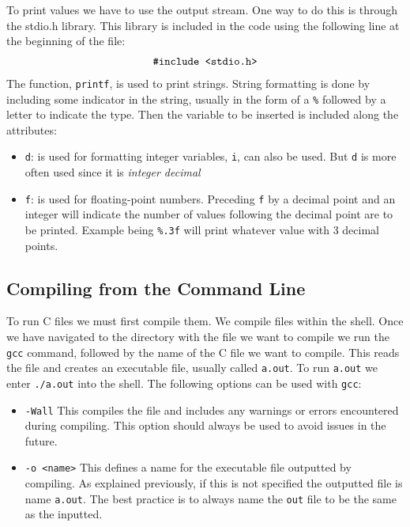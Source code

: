 \documentclass{report}
\begin{document}
    To print values we have to use the output stream. One way to do this is through the stdio.h library. This library is included in the code using the following line at the beginning of the file:
    \begin{align}
      \textnormal{\texttt{\#include <stdio.h>}}
    \end{align}
    The function, \texttt{printf}, is used to print strings. String formatting is done by including some indicator in the string, usually in the form of a \texttt{\%} followed by a letter to indicate the type. Then the variable to be inserted is included along the attributes:
    \begin{itemize}
      \item \texttt{d}: is used for formatting integer variables, \texttt{i}, can also be used. But \texttt{d} is more often used since it is \textit{integer decimal}
      \item \texttt{f}: is used for floating-point numbers. Preceding \texttt{f} by a decimal point and an integer will indicate the number of values following the decimal point are to be printed. Example being \texttt{\%.3f} will print whatever value with 3 decimal points.
    \end{itemize}\vspace{-.5cm}
     


    \subsection{Compiling from the Command Line}
    To run C files we must first compile them. We compile files within the shell. Once we have navigated to the directory with the file we want to compile we run the \texttt{gcc} command, followed by the name of the C file we want to compile. This reads the file and creates an executable file, usually called \texttt{a.out}. To run \texttt{a.out} we enter \texttt{./a.out} into the shell. The following options can be used with \texttt{gcc}:
   \begin{itemize}
      \item \texttt{-Wall} This compiles the file and includes any warnings or errors encountered during compiling. This option should always be used to avoid issues in the future.
      \item \texttt{-o <name>} This defines a name for the executable file outputted by compiling. As explained previously, if this is not specified the outputted file is name \texttt{a.out}. The best practice is to always name the \texttt{out} file to be the same as the inputted.
   \end{itemize}
\end{document}
